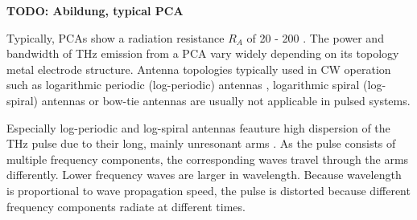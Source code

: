 \textbf{TODO: Abildung, typical PCA}

Typically, PCAs show a radiation resistance $R_A$ of \num{20} - \num{200} \si{\Omega}. The power and bandwidth of THz emission from a PCA vary widely depending on its topology metal electrode structure. Antenna topologies typically used in CW operation such as logarithmic periodic (log-periodic) antennas \cite{mendisTunableCWTHzSystem2004}, logarithmic spiral (log-spiral) \cite{linRoomtemperatureContinuouswaveTerahertz2025} antennas or bow-tie antennas \cite{PDFBowtieWideband} are usually not applicable in pulsed systems. 

Especially log-periodic and log-spiral antennas feauture high dispersion of the THz pulse due to their long, mainly unresonant arms \cite{fernandezolveraDispersivePropertiesSelfcomplementary2017a}. As the pulse consists of multiple frequency components, the corresponding waves travel through the arms differently. Lower frequency waves are larger in wavelength. Because wavelength is proportional to wave propagation speed, the pulse is distorted because different frequency components radiate at different times. 